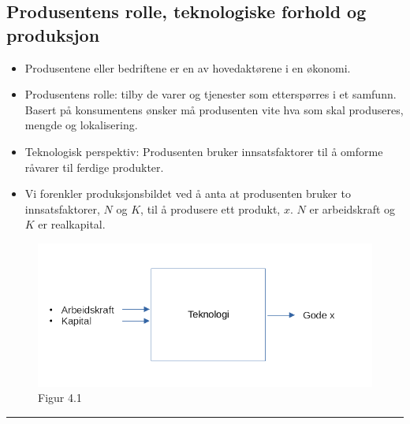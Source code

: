 \documentclass[
  letterpaper,
  DIV=11,
  numbers=noendperiod]{scrartcl}
\begin{document}
\subsection{Produsentens rolle, teknologiske forhold og
produksjon}\label{produsentens-rolle-teknologiske-forhold-og-produksjon}

\begin{itemize}
\item
  Produsentene eller bedriftene er en av hovedaktørene i en økonomi.
\item
  Produsentens rolle: tilby de varer og tjenester som etterspørres i et
  samfunn. Basert på konsumentens ønsker må produsenten vite hva som
  skal produseres, mengde og lokalisering.
\item
  Teknologisk perspektiv: Produsenten bruker innsatsfaktorer til å
  omforme råvarer til ferdige produkter.
\item
  Vi forenkler produksjonsbildet ved å anta at produsenten bruker to
  innsatsfaktorer, \(N\) og \(K\), til å produsere ett produkt, \(x\).
  \(N\) er arbeidskraft og \(K\) er realkapital.
\end{itemize}

\begin{figure}[H]

{\centering \includegraphics[width=1\textwidth,height=\textheight]{drawio/prodbildetf.png}

}

\caption{Figur 4.1}

\end{figure}%

\begin{center}\rule{0.5\linewidth}{0.5pt}\end{center}
\end{document}
